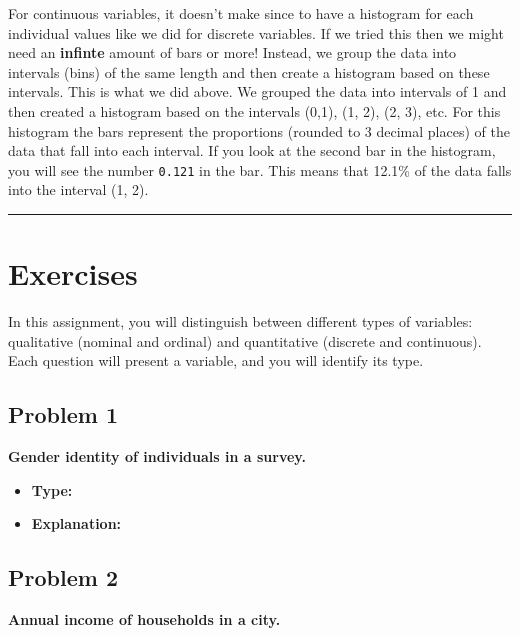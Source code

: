 \documentclass[
  letterpaper,
  DIV=11,
  numbers=noendperiod]{scrreprt}
\begin{document}
For continuous variables, it doesn't make since to have a histogram for
each individual values like we did for discrete variables. If we tried
this then we might need an \textbf{infinte} amount of bars or more!
Instead, we group the data into intervals (bins) of the same length and
then create a histogram based on these intervals. This is what we did
above. We grouped the data into intervals of 1 and then created a
histogram based on the intervals (0,1), (1, 2), (2, 3), etc. For this
histogram the bars represent the proportions (rounded to 3 decimal
places) of the data that fall into each interval. If you look at the
second bar in the histogram, you will see the number \texttt{0.121} in
the bar. This means that 12.1\% of the data falls into the interval (1,
2).

\begin{center}\rule{0.5\linewidth}{0.5pt}\end{center}

\section*{Exercises}\label{exercises}


In this assignment, you will distinguish between different types of
variables: qualitative (nominal and ordinal) and quantitative (discrete
and continuous). Each question will present a variable, and you will
identify its type.

\subsection*{Problem 1}\label{problem-1}

\textbf{Gender identity of individuals in a survey.}

\begin{itemize}
\item
  \textbf{Type:}
\item
  \textbf{Explanation:}
\end{itemize}

\subsection*{Problem 2}\label{problem-2}

\textbf{Annual income of households in a city.}
\end{document}

